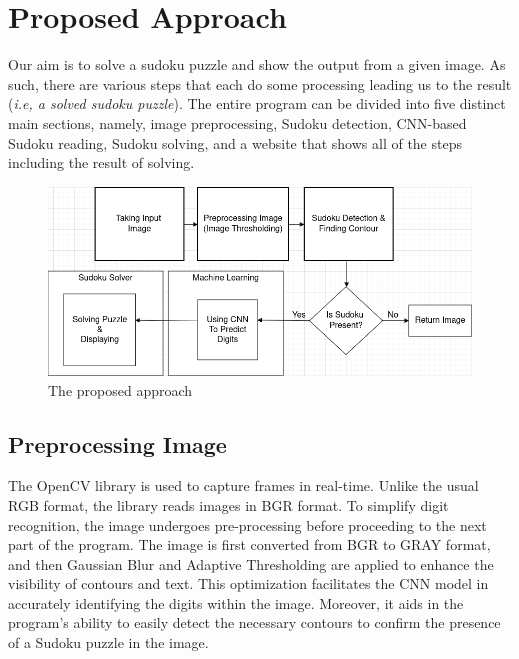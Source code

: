 \documentclass[conference]{IEEEtran}
\begin{document}
\section{Proposed Approach}
Our aim is to solve a sudoku puzzle and show the output from a given image. As such, there are various steps that each do some processing leading us to the result (\textit{i.e, a solved sudoku puzzle}). The entire program can be divided into five distinct main sections, namely, image preprocessing, Sudoku detection, CNN-based Sudoku reading, Sudoku solving, and a website that shows all of the steps including the result of solving.

\begin{figure}[htbp]
\centerline{\includegraphics[scale=0.3]{assets/proposed_approach.png}}
\caption{The proposed approach}
\label{proposed_approach}
\end{figure}

\subsection{Preprocessing Image}\label{preprocess_step}
The OpenCV library is used to capture frames in real-time. Unlike the usual RGB format, the library reads images in BGR format. To simplify digit recognition, the image undergoes pre-processing before proceeding to the next part of the program. The image is first converted from BGR to GRAY format, and then Gaussian Blur and Adaptive Thresholding are applied to enhance the visibility of contours and text. This optimization facilitates the CNN model in accurately identifying the digits within the image. Moreover, it aids in the program's ability to easily detect the necessary contours to confirm the presence of a Sudoku puzzle in the image.
\end{document}
